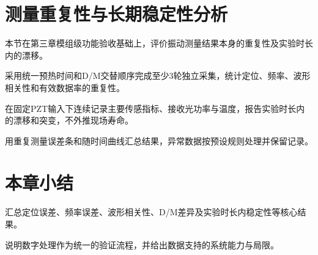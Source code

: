 \section{测量重复性与长期稳定性分析}

本节在第三章模组级功能验收基础上，评价振动测量结果本身的重复性及实验时长内的漂移。

\begin{writingplan}
  \item 采用统一预热时间和D/M交替顺序完成至少3轮独立采集，统计定位、频率、波形相关性和有效数据率的重复性。
  \item 在固定PZT输入下连续记录主要传感指标、接收光功率与温度，报告实验时长内的漂移和突变，不外推现场寿命。
  \item 用重复测量误差条和随时间曲线汇总结果，异常数据按预设规则处理并保留记录。
\end{writingplan}

\section{本章小结}

\begin{writingplan}
  \item 汇总定位误差、频率误差、波形相关性、D/M差异及实验时长内稳定性等核心结果。
  \item 说明数字处理作为统一的验证流程，并给出数据支持的系统能力与局限。
\end{writingplan}
